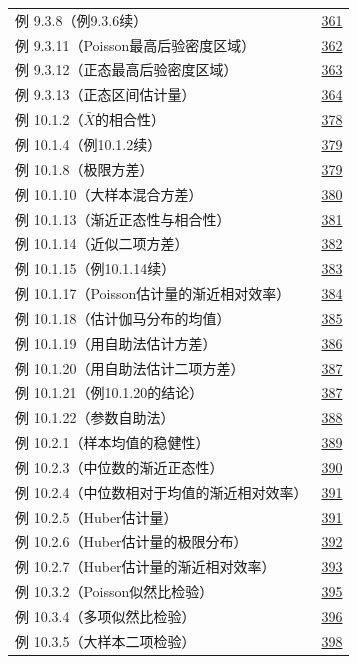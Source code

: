 \begin{longtable}{@{}p{}r@{}}
例 9.3.8（例9.3.6续） & \hyperref[ex:9.3.8]{361} \\
例 9.3.11（Poisson最高后验密度区域） & \hyperref[ex:9.3.11]{362} \\
例 9.3.12（正态最高后验密度区域） & \hyperref[ex:9.3.12]{363} \\
例 9.3.13（正态区间估计量） & \hyperref[ex:9.3.13]{364} \\
\addlinespace[.5em]
例 10.1.2（$\bar X$的相合性） & \hyperref[ex:10.1.2]{378} \\
例 10.1.4（例10.1.2续） & \hyperref[ex:10.1.4]{379} \\
例 10.1.8（极限方差） & \hyperref[ex:10.1.8]{379} \\
例 10.1.10（大样本混合方差） & \hyperref[ex:10.1.10]{380} \\
例 10.1.13（渐近正态性与相合性） & \hyperref[ex:10.1.13]{381} \\
例 10.1.14（近似二项方差） & \hyperref[ex:10.1.14]{382} \\
例 10.1.15（例10.1.14续） & \hyperref[ex:10.1.15]{383} \\
例 10.1.17（Poisson估计量的渐近相对效率） & \hyperref[ex:10.1.17]{384} \\
例 10.1.18（估计伽马分布的均值） & \hyperref[ex:10.1.18]{385} \\
例 10.1.19（用自助法估计方差） & \hyperref[ex:10.1.19]{386} \\
例 10.1.20（用自助法估计二项方差） & \hyperref[ex:10.1.20]{387} \\
例 10.1.21（例10.1.20的结论） & \hyperref[ex:10.1.21]{387} \\
例 10.1.22（参数自助法） & \hyperref[ex:10.1.22]{388} \\
例 10.2.1（样本均值的稳健性） & \hyperref[ex:10.2.1]{389} \\
例 10.2.3（中位数的渐近正态性） & \hyperref[ex:10.2.3]{390} \\
例 10.2.4（中位数相对于均值的渐近相对效率） & \hyperref[ex:10.2.4]{391} \\
例 10.2.5（Huber估计量） & \hyperref[ex:10.2.5]{391} \\
例 10.2.6（Huber估计量的极限分布） & \hyperref[ex:10.2.6]{392} \\
例 10.2.7（Huber估计量的渐近相对效率） & \hyperref[ex:10.2.7]{393} \\
例 10.3.2（Poisson似然比检验） & \hyperref[ex:10.3.2]{395} \\
例 10.3.4（多项似然比检验） & \hyperref[ex:10.3.4]{396} \\
例 10.3.5（大样本二项检验） & \hyperref[ex:10.3.5]{398} \\

\end{longtable}
